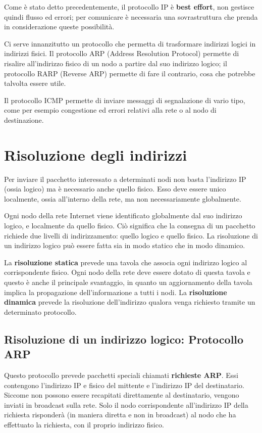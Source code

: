 Come è stato detto precedentemente, il protocollo IP è \textbf{best effort}, non gestisce quindi flusso ed errori; per comunicare è necessaria una sovrastruttura che prenda in considerazione queste possibilità.

Ci serve innanzitutto un protocollo che permetta di trasformare indirizzi logici in indirizzi fisici. Il protocollo ARP (Address Resolution Protocol) permette di risalire all'indirizzo fisico di un nodo a partire dal suo indirizzo logico; il protocollo RARP (Reverse ARP) permette di fare il contrario, cosa che potrebbe talvolta essere utile.

Il protocollo ICMP permette di inviare messaggi di segnalazione di vario tipo, come per esempio congestione ed errori relativi alla rete o al nodo di destinazione.

\section{Risoluzione degli indirizzi}
    Per inviare il pacchetto interessato a determinati nodi non basta l'indirizzo IP (ossia logico) ma è necessario anche quello fisico. Esso deve essere unico localmente, ossia all'interno della rete, ma non necessariamente globalmente.
    
    Ogni nodo della rete Internet viene identificato globalmente dal suo indirizzo logico, e localmente da quello fisico. Ciò significa che la consegna di un pacchetto richiede due livelli di indirizzamento: quello logico e quello fisico. La risoluzione di un indirizzo logico può essere fatta sia in modo statico che in modo dinamico.
    
    La \textbf{risoluzione statica} prevede una tavola che associa ogni indirizzo logico al corrispondente fisico. Ogni nodo della rete deve essere dotato di questa tavola e questo è anche il principale svantaggio, in quanto un aggiornamento della tavola implica la propagazione dell'informazione a tutti i nodi. La \textbf{risoluzione dinamica} prevede la risoluzione dell'indirizzo qualora venga richiesto tramite un determinato protocollo.
    
    \subsection{Risoluzione di un indirizzo logico: Protocollo ARP}
        Questo protocollo prevede pacchetti speciali chiamati \textbf{richieste ARP}. Essi contengono l'indirizzo IP e fisico del mittente e l'indirizzo IP del destinatario. Siccome non possono essere recapitati direttamente al destinatario, vengono inviati in broadcast sulla rete. Solo il nodo corrispondente all'indirizzo IP della richiesta risponderà (in maniera diretta e non in broadcast) al nodo che ha effettuato la richiesta, con il proprio indirizzo fisico.
        
